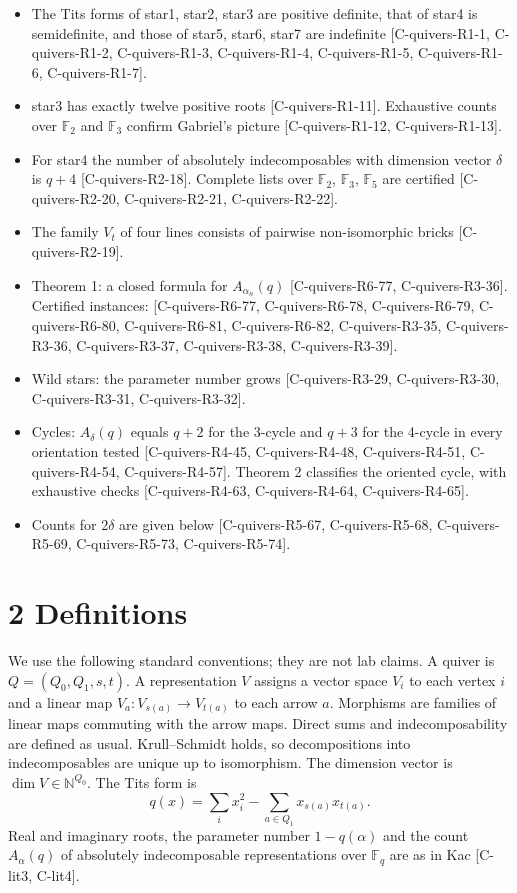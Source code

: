 \documentclass[10pt,twocolumn]{article}
\begin{document}
\begin{itemize}
\item The Tits forms of star1, star2, star3 are positive definite, that of star4 is semidefinite, and those of star5, star6, star7 are indefinite {\scriptsize[C-quivers-R1-1, C-quivers-R1-2, C-quivers-R1-3, C-quivers-R1-4, C-quivers-R1-5, C-quivers-R1-6, C-quivers-R1-7]}.
\item star3 has exactly twelve positive roots {\scriptsize[C-quivers-R1-11]}. Exhaustive counts over $\mathbb F_2$ and $\mathbb F_3$ confirm Gabriel's picture {\scriptsize[C-quivers-R1-12, C-quivers-R1-13]}.
\item For star4 the number of absolutely indecomposables with dimension vector $\delta$ is $q+4$ {\scriptsize[C-quivers-R2-18]}. Complete lists over $\mathbb F_2$, $\mathbb F_3$, $\mathbb F_5$ are certified {\scriptsize[C-quivers-R2-20, C-quivers-R2-21, C-quivers-R2-22]}.
\item The family $V_t$ of four lines consists of pairwise non-isomorphic bricks {\scriptsize[C-quivers-R2-19]}.
\item Theorem 1: a closed formula for $A_{\alpha_n}(q)$ {\scriptsize[C-quivers-R6-77, C-quivers-R3-36]}. Certified instances: {\scriptsize[C-quivers-R6-77, C-quivers-R6-78, C-quivers-R6-79, C-quivers-R6-80, C-quivers-R6-81, C-quivers-R6-82, C-quivers-R3-35, C-quivers-R3-36, C-quivers-R3-37, C-quivers-R3-38, C-quivers-R3-39]}.
\item Wild stars: the parameter number grows {\scriptsize[C-quivers-R3-29, C-quivers-R3-30, C-quivers-R3-31, C-quivers-R3-32]}.
\item Cycles: $A_\delta(q)$ equals $q+2$ for the 3-cycle and $q+3$ for the 4-cycle in every orientation tested {\scriptsize[C-quivers-R4-45, C-quivers-R4-48, C-quivers-R4-51, C-quivers-R4-54, C-quivers-R4-57]}. Theorem 2 classifies the oriented cycle, with exhaustive checks {\scriptsize[C-quivers-R4-63, C-quivers-R4-64, C-quivers-R4-65]}.
\item Counts for $2\delta$ are given below {\scriptsize[C-quivers-R5-67, C-quivers-R5-68, C-quivers-R5-69, C-quivers-R5-73, C-quivers-R5-74]}.
\end{itemize}

\section*{2 Definitions}

We use the following standard conventions; they are not lab claims. A quiver is $Q=(Q_0,Q_1,s,t)$. A representation $V$ assigns a vector space $V_i$ to each vertex $i$ and a linear map $V_a:V_{s(a)}\to V_{t(a)}$ to each arrow $a$. Morphisms are families of linear maps commuting with the arrow maps. Direct sums and indecomposability are defined as usual. Krull–Schmidt holds, so decompositions into indecomposables are unique up to isomorphism. The dimension vector is $\dim V\in\mathbb N^{Q_0}$. The Tits form is
$$q(x)=\sum_i x_i^2-\sum_{a\in Q_1}x_{s(a)}x_{t(a)}.$$
Real and imaginary roots, the parameter number $1-q(\alpha)$ and the count $A_\alpha(q)$ of absolutely indecomposable representations over $\mathbb F_q$ are as in Kac {\scriptsize[C-lit3, C-lit4]}.
\end{document}
